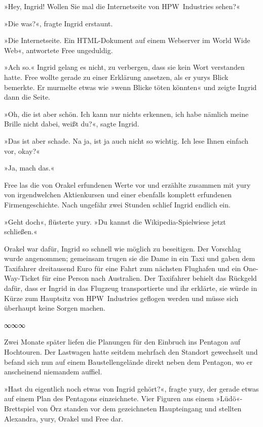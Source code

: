 »Hey, Ingrid! Wollen Sie mal die Internetseite von HPW~Industries sehen?«

»Die was?«, fragte Ingrid erstaunt.

»Die Internetseite. Ein HTML-Dokument auf einem Webserver im World Wide Web«, antwortete Free ungeduldig.

»Ach so.« Ingrid gelang es nicht, zu verbergen, dass sie kein Wort verstanden hatte. Free wollte gerade zu einer Erklärung ansetzen, als er yurys Blick bemerkte. Er murmelte etwas wie »wenn Blicke töten könnten« und zeigte Ingrid dann die Seite.

»Oh, die ist aber schön. Ich kann nur nichts erkennen, ich habe nämlich meine Brille nicht dabei, weißt du?«, sagte Ingrid.

»Das ist aber schade. Na ja, ist ja auch nicht so wichtig. Ich lese Ihnen einfach vor, okay?«

»Ja, mach das.«

Free las die von Orakel erfundenen Werte vor und erzählte zusammen mit yury von irgendwelchen Aktienkursen und einer ebenfalls komplett erfundenen Firmengeschichte. Nach ungefähr zwei Stunden schlief Ingrid endlich ein.

»Geht doch«, flüsterte yury. »Du kannst die Wikipedia-Spielwiese jetzt schließen.«

Orakel war dafür, Ingrid so schnell wie möglich zu beseitigen. Der Vorschlag wurde angenommen; gemeinsam trugen sie die Dame in ein Taxi und gaben dem Taxifahrer dreitausend Euro für eine Fahrt zum nächsten Flughafen und ein One-Way-Ticket für eine Person nach Australien. Der Taxifahrer behielt das Rückgeld dafür, dass er Ingrid in das Flugzeug transportierte und ihr erklärte, sie würde in Kürze zum Hauptsitz von HPW~Industries geflogen werden und müsse sich überhaupt keine Sorgen machen.

\begin{center}
    ∞∞∞
\end{center}

Zwei Monate später liefen die Planungen für den Einbruch ins Pentagon auf Hochtouren. Der Lastwagen hatte seitdem mehrfach den Standort gewechselt und befand sich nun auf einem Baustellengelände direkt neben dem Pentagon, wo er anscheinend niemandem auffiel.

»Hast du eigentlich noch etwas von Ingrid gehört?«, fragte yury, der gerade etwas auf einem Plan des Pentagons einzeichnete. Vier Figuren aus einem »Lüdö«-Brettspiel von Örz standen vor dem gezeichneten Haupteingang und stellten Alexandra, yury, Orakel und Free dar.

